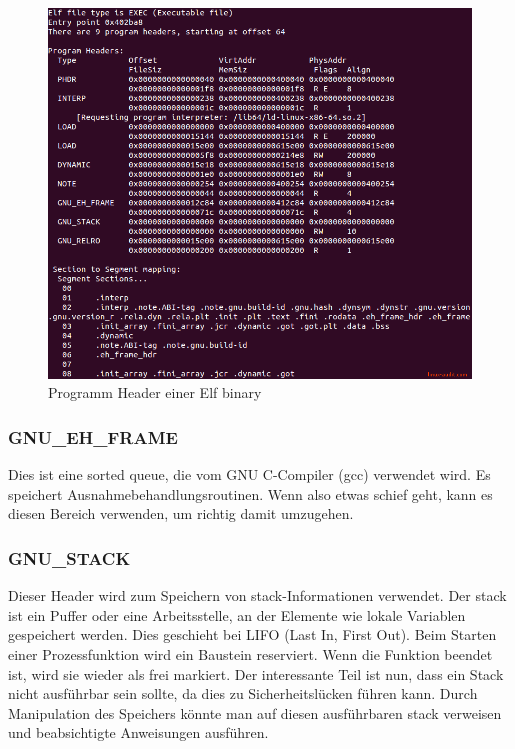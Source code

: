 \begin{figure}[H]
    \begin{center}
        \includegraphics[scale=0.5]{images/elf-program-headers-segments.png}
        \caption{Programm Header einer Elf binary \cite{program_headers_of_Elf_binary}}
    \end{center}
\end{figure}

\subsubsection{GNU\_EH\_FRAME}
Dies ist eine sorted queue, die vom GNU C-Compiler (gcc) verwendet wird. Es speichert Ausnahmebehandlungsroutinen. Wenn also etwas schief geht, kann es diesen Bereich verwenden, um richtig damit umzugehen.

\subsubsection{GNU\_STACK}
Dieser Header wird zum Speichern von stack-Informationen verwendet. Der stack ist ein Puffer oder eine Arbeitsstelle, an der Elemente wie lokale Variablen gespeichert werden. Dies geschieht bei LIFO (Last In, First Out). Beim Starten einer Prozessfunktion wird ein Baustein reserviert. Wenn die Funktion beendet ist, wird sie wieder als frei markiert. Der interessante Teil ist nun, dass ein Stack nicht ausführbar sein sollte, da dies zu Sicherheitslücken führen kann. Durch Manipulation des Speichers könnte man auf diesen ausführbaren stack verweisen und beabsichtigte Anweisungen ausführen.

